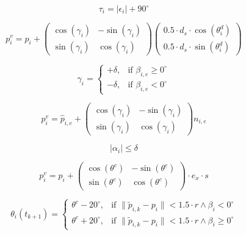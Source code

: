\documentclass[conference]{IEEEtran}
\begin{document}
\begin{equation}
\tau_i = | \epsilon_i | + 90^\circ
\label{eq:32}
\end{equation}

\begin{equation}
p^v_i = p_i +
\begin{pmatrix}
\cos(\gamma_i) & -\sin(\gamma_i) \\
\sin(\gamma_i) & \cos(\gamma_i)
\end{pmatrix}
\begin{pmatrix}
0.5 \cdot d_s \cdot \cos(\theta^d_i) \\
0.5 \cdot d_s \cdot \sin(\theta^d_i)
\end{pmatrix}
\label{eq:33}
\end{equation}

\begin{equation}
\gamma_i =
\begin{cases}
+\delta, & \text{if } \beta_{i,e} \geq 0^\circ \\
-\delta, & \text{if } \beta_{i,e} < 0^\circ
\end{cases}
\label{eq:34}
\end{equation}

\begin{equation}
p^v_i = \hat{p}_{i,e} +
\begin{pmatrix}
\cos(\gamma_i) & -\sin(\gamma_i) \\
\sin(\gamma_i) & \cos(\gamma_i)
\end{pmatrix}
n_{i,e}
\label{eq:35}
\end{equation}

\begin{equation}
| \alpha_i | \leq \delta
\label{eq:36}
\end{equation}

\begin{equation}
p^v_i = p_i +
\begin{pmatrix}
\cos(\theta^c) & -\sin(\theta^c) \\
\sin(\theta^c) & \cos(\theta^c)
\end{pmatrix}
\cdot e_x \cdot s
\label{eq:37}
\end{equation}

\begin{equation}
\theta_i(t_{k+1}) =
\begin{cases}
\theta^c - 20^\circ, & \text{if } \| \tilde{p}_{i,k} - p_i \| < 1.5 \cdot r \wedge \beta_i < 0^\circ \\
\theta^c + 20^\circ, & \text{if } \| \tilde{p}_{i,k} - p_i \| < 1.5 \cdot r \wedge \beta_i \geq 0^\circ
\end{cases}
\label{eq:38}
\end{equation}
\end{document}
